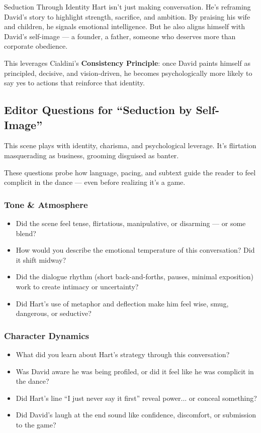 \begin{PsychologicalSidebar}{Seduction Through Identity}
Hart isn’t just making conversation. He’s reframing David’s story to highlight strength, sacrifice, and ambition.
By praising his wife and children, he signals emotional intelligence. But he also aligns himself with 
David’s self-image — a founder, a father, someone who deserves more than corporate obedience.

This leverages Cialdini’s \textbf{Consistency Principle}: once David paints himself as principled, decisive, 
and vision-driven, he becomes psychologically more likely to say yes to actions that reinforce that identity.
\end{PsychologicalSidebar}

\subsection*{Editor Questions for ``Seduction by Self-Image''}
This scene plays with identity, charisma, and psychological leverage.
It's flirtation masquerading as business, grooming disguised as banter.

These questions probe how language, pacing, and subtext guide the reader to feel complicit in the dance — even before realizing it’s a game.

\subsubsection{Tone \& Atmosphere}

\begin{itemize}
    \item Did the scene feel tense, flirtatious, manipulative, or disarming — or some blend?
    \item How would you describe the emotional temperature of this conversation? Did it shift midway?
    \item Did the dialogue rhythm (short back-and-forths, pauses, minimal exposition) work to create intimacy or uncertainty?
    \item Did Hart’s use of metaphor and deflection make him feel wise, smug, dangerous, or seductive?
\end{itemize}

\subsubsection{Character Dynamics}

\begin{itemize}
    \item What did you learn about Hart’s strategy through this conversation?
    \item Was David aware he was being profiled, or did it feel like he was complicit in the dance?
    \item Did Hart's line “I just never say it first” reveal power... or conceal something?
    \item Did David’s laugh at the end sound like confidence, discomfort, or submission to the game?
\end{itemize}

